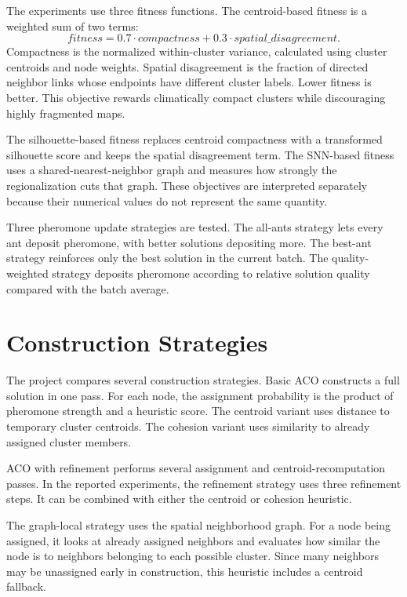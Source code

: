 \documentclass[11pt]{article}
\begin{document}
The experiments use three fitness functions. The centroid-based fitness is a weighted sum of two terms:
\[
fitness = 0.7 \cdot compactness + 0.3 \cdot spatial\_disagreement.
\]
Compactness is the normalized within-cluster variance, calculated using cluster centroids and node weights. Spatial disagreement is the fraction of directed neighbor links whose endpoints have different cluster labels. Lower fitness is better. This objective rewards climatically compact clusters while discouraging highly fragmented maps.

The silhouette-based fitness replaces centroid compactness with a transformed silhouette score and keeps the spatial disagreement term. The SNN-based fitness uses a shared-nearest-neighbor graph and measures how strongly the regionalization cuts that graph. These objectives are interpreted separately because their numerical values do not represent the same quantity.

Three pheromone update strategies are tested. The all-ants strategy lets every ant deposit pheromone, with better solutions depositing more. The best-ant strategy reinforces only the best solution in the current batch. The quality-weighted strategy deposits pheromone according to relative solution quality compared with the batch average.

\section*{Construction Strategies}

The project compares several construction strategies. Basic ACO constructs a full solution in one pass. For each node, the assignment probability is the product of pheromone strength and a heuristic score. The centroid variant uses distance to temporary cluster centroids. The cohesion variant uses similarity to already assigned cluster members.

ACO with refinement performs several assignment and centroid-recomputation passes. In the reported experiments, the refinement strategy uses three refinement steps. It can be combined with either the centroid or cohesion heuristic.

The graph-local strategy uses the spatial neighborhood graph. For a node being assigned, it looks at already assigned neighbors and evaluates how similar the node is to neighbors belonging to each possible cluster. Since many neighbors may be unassigned early in construction, this heuristic includes a centroid fallback.
\end{document}

